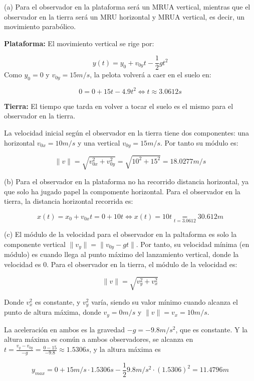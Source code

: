 \begin{solucion}
    (a) Para el observador en la plataforma será un MRUA vertical, mientras que el observador en la tierra será un MRU horizontal y MRUA vertical, es decir, un movimiento parabólico.

    \textbf{Plataforma:} El movimiento vertical se rige por:

    \begin{equation*}
        y(t) = y_0 + v_{0y}t - \frac{1}{2}g t^2
    \end{equation*}
    Como $y_0 = 0$ y $v_{0y} = 15m/s$, la pelota volverá a caer en el suelo en:

    \begin{equation*}
        0 = 0 + 15t - 4.9t^2 \Leftrightarrow t \approx 3.0612s
    \end{equation*}

    \textbf{Tierra:} El tiempo que tarda en volver a tocar el suelo es el mismo para el observador en la tierra.

    La velocidad inicial según el observador en la tierra tiene dos componentes: una horizontal $v_{0x} = 10m/s$ y una vertical $v_{0y} = 15 m/s$. Por tanto su módulo es:

    \begin{equation*}
        \| v \| = \sqrt{v_{0x}^2 + v_{0y}^2} = \sqrt{10^2 + 15^2} = 18.0277m/s
    \end{equation*}

    (b) Para el observador en la plataforma no ha recorrido distancia horizontal, ya que solo ha jugado papel la compomente horizontal. Para el observador en la tierra, la distancia horizontal recorrida es:

    \begin{equation*}
        x(t) = x_0 + v_{0x}t = 0 + 10t \Leftrightarrow x(t) = 10t \underset{t=3.0612}{=} 30.612m
    \end{equation*}

    (c) El módulo de la velocidad para el observador en la paltaforma es solo la componente vertical $\|v_y\| = \|v_{0y} -gt\|$. Por tanto, su velocidad mínima (en módulo) es cuando llega al punto máximo del lanzamiento vertical, donde la velocidad es 0.
    Para el observador en la tierra, el módulo de la velocidad es:

    \begin{equation*}
        \|v\| = \sqrt{v_y^2 + v_x^2}
    \end{equation*}

    Donde $v_x^2$ es constante, y $v_y^2$ varía, siendo su valor mínimo cuando alcanza el punto de altura máxima, donde $v_y=0 m/s$ y $\|v\| = v_{x} = 10m/s$.

    La aceleración en ambos es la gravedad $-g = -9.8m/s^2$, que es constante. Y la altura máxima es común a ambos observadores, se alcanza en $t = \frac{v_y - v_{0y}}{-g} = \frac{0 - 15}{-9.8} \approx 1.5306s$, y la altura máxima es

    \begin{equation*}
        y_{max} = 0 + 15m/s \cdot 1.5306s -\frac{1}{2}9.8m/s^2 \cdot (1.5306)^2 = 11.4796m 
    \end{equation*}
\end{solucion}
